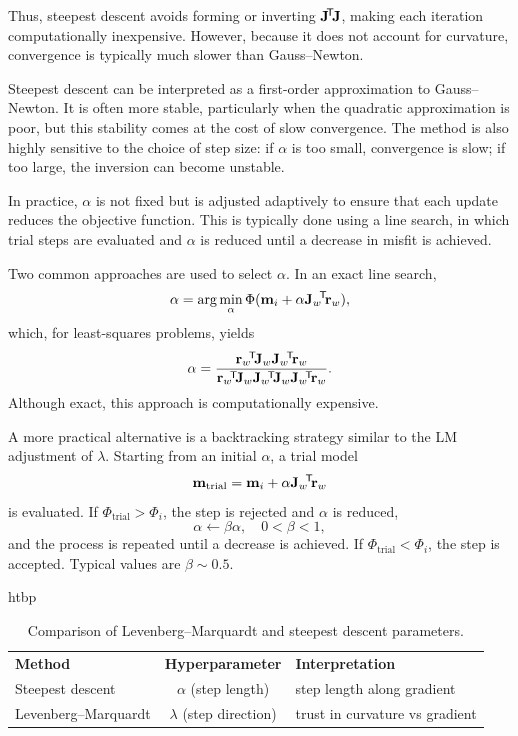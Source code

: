 Thus, steepest descent avoids forming or inverting $\vb{J}\!^\mathsf{T}\! \vb{J}$, making each iteration computationally inexpensive. However, because it does not account for curvature, convergence is typically much slower than Gauss--Newton.

Steepest descent can be interpreted as a first-order approximation to Gauss--Newton. It is often more stable, particularly when the quadratic approximation is poor, but this stability comes at the cost of slow convergence. The method is also highly sensitive to the choice of step size: if $\alpha$ is too small, convergence is slow; if too large, the inversion can become unstable.

In practice, $\alpha$ is not fixed but is adjusted adaptively to ensure that each update reduces the objective function. This is typically done using a line search, in which trial steps are evaluated and $\alpha$ is reduced until a decrease in misfit is achieved.

Two common approaches are used to select $\alpha$. In an exact line search,
\[
    \alpha = \arg\min_\alpha \Phi(\vb{m}_i + \alpha \vb{J}_w\!^\mathsf{T}\! \vb{r}_w),
\]
which, for least-squares problems, yields
\[
    \alpha =
    \frac{\vb{r}_w\T \vb{J}_w \vb{J}_w\T \vb{r}_w}
         {\vb{r}_w\T \vb{J}_w \vb{J}_w\T \vb{J}_w \vb{J}_w\T \vb{r}_w}.
\]
Although exact, this approach is computationally expensive.

A more practical alternative is a backtracking strategy similar to the LM adjustment of $\lambda$. Starting from an initial $\alpha$, a trial model
\[
    \vb{m}_{\text{trial}} = \vb{m}_i + \alpha \vb{J}_w\!^\mathsf{T}\! \vb{r}_w
\]
is evaluated. If $\Phi_{\text{trial}} > \Phi_i$, the step is rejected and $\alpha$ is reduced,
\[
    \alpha \leftarrow \beta \alpha,
\quad 0 < \beta < 1,
\]
and the process is repeated until a decrease is achieved. If $\Phi_{\text{trial}} < \Phi_i$, the step is accepted. Typical values are $\beta \sim 0.5$.

\begin{table}{htbp}
    \centering
    \caption{Comparison of Levenberg--Marquardt and steepest descent parameters.}
    \label{tab:inv_hyperparameters}
    \begin{tabular}{@{}lcl@{}}
        \toprule
        \textbf{Method} & \textbf{Hyperparameter} & \textbf{Interpretation} \\
        Steepest descent & $\alpha$ (step length) & step length along gradient \\
        Levenberg--Marquardt & $\lambda$ (step direction) & trust in curvature vs gradient \\
        \bottomrule
    \end{tabular}
\end{table}

